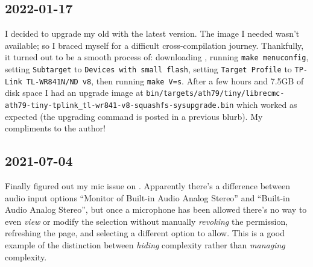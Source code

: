 \documentclass{article}
\begin{document}
\subsection{2022-01-17}
I decided to upgrade my old  with the latest  version.  The image I needed wasn't available; so I braced myself for a difficult cross-compilation journey.  Thankfully, it turned out to be a smooth process of: downloading , running \texttt{make menuconfig}, setting \texttt{Subtarget} to \texttt{Devices with small flash}, setting \texttt{Target Profile} to \texttt{TP-Link TL-WR841N/ND v8}, then running \texttt{make V=s}.  After a few hours and 7.5GB of disk space I had an upgrade image at \texttt{bin/targets/ath79/tiny/librecmc-ath79-tiny-tplink_tl-wr841-v8-squashfs-sysupgrade.bin} which worked as expected (the upgrading command is posted in a previous blurb).  My compliments to the author!

\subsection{2021-07-04}
Finally figured out my mic issue on .  Apparently there's a difference between audio input options ``Monitor of Built-in Audio Analog Stereo'' and ``Built-in Audio Analog Stereo'', but once a microphone has been allowed there's no way to even \emph{view} or modify the selection without manually \emph{revoking} the permission, refreshing the page, and selecting a different option to allow.  This is a good example of the distinction between \emph{hiding} complexity rather than \emph{managing} complexity.
\end{document}

